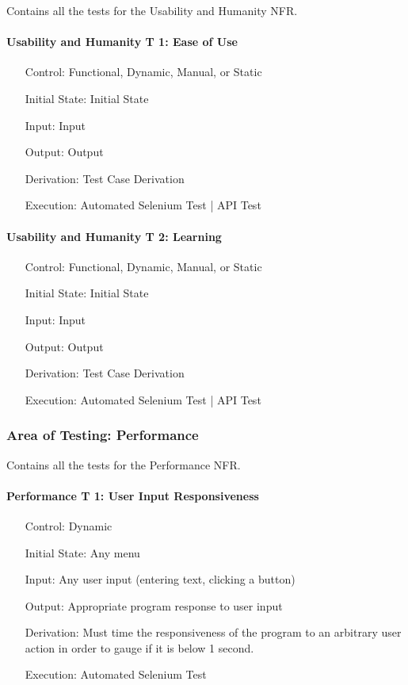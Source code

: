 \documentclass[12pt, titlepage]{article}
\begin{document}
Contains all the tests for the Usability and Humanity NFR.

\paragraph*{Usability and Humanity T 1: Ease of Use}
\begin{itemize}
	\item[Control:] Functional, Dynamic, Manual, or Static
	\item[Initial State:] Initial State
	\item[Input:] Input
	\item[Output:] Output
	\item[Derivation:] Test Case Derivation
	\item[Execution:] Automated Selenium Test | API Test
\end{itemize}

\paragraph*{Usability and Humanity T 2: Learning}
\begin{itemize}
	\item[Control:] Functional, Dynamic, Manual, or Static
	\item[Initial State:] Initial State
	\item[Input:] Input
	\item[Output:] Output
	\item[Derivation:] Test Case Derivation
	\item[Execution:] Automated Selenium Test | API Test
\end{itemize}

\subsubsection{Area of Testing: Performance}

Contains all the tests for the Performance NFR.

\paragraph*{Performance T 1: User Input Responsiveness}
\begin{itemize}
	\item[Control:] Dynamic
	\item[Initial State:] Any menu
	\item[Input:] Any user input (entering text, clicking a button)
	\item[Output:] Appropriate program response to user input
	\item[Derivation:] Must time the responsiveness of the program to an arbitrary user action in order to gauge if it is below 1 second.
	\item[Execution:] Automated Selenium Test
\end{itemize}
\end{document}
